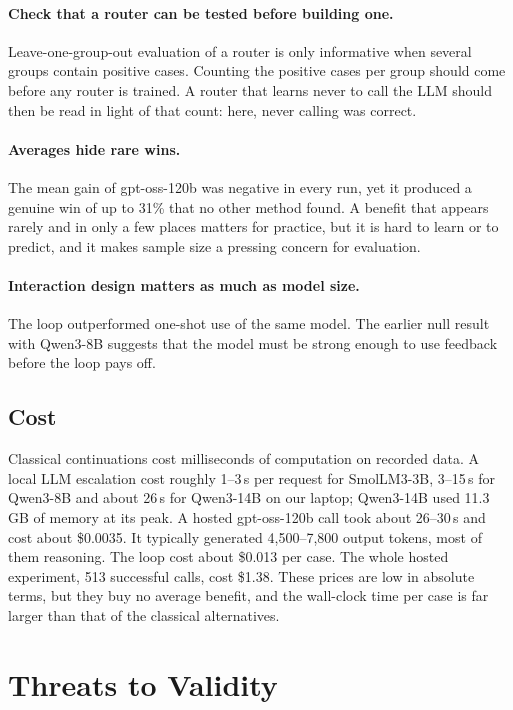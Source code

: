 \paragraph{Check that a router can be tested before building one.} Leave-one-group-out evaluation of a router is only informative when several groups contain positive cases. Counting the positive cases per group should come before any router is trained. A router that learns never to call the LLM should then be read in light of that count: here, never calling was correct.

\paragraph{Averages hide rare wins.} The mean gain of gpt-oss-120b was negative in every run, yet it produced a genuine win of up to 31\% that no other method found. A benefit that appears rarely and in only a few places matters for practice, but it is hard to learn or to predict, and it makes sample size a pressing concern for evaluation.

\paragraph{Interaction design matters as much as model size.} The loop outperformed one-shot use of the same model. The earlier null result with Qwen3-8B suggests that the model must be strong enough to use feedback before the loop pays off.

\subsection{Cost}

Classical continuations cost milliseconds of computation on recorded data. A local LLM escalation cost roughly 1--3\,s per request for SmolLM3-3B, 3--15\,s for Qwen3-8B and about 26\,s for Qwen3-14B on our laptop; Qwen3-14B used 11.3\,GB of memory at its peak. A hosted gpt-oss-120b call took about 26--30\,s and cost about \$0.0035. It typically generated 4,500--7,800 output tokens, most of them reasoning. The loop cost about \$0.013 per case. The whole hosted experiment, 513 successful calls, cost \$1.38. These prices are low in absolute terms, but they buy no average benefit, and the wall-clock time per case is far larger than that of the classical alternatives.

\section{Threats to Validity}

